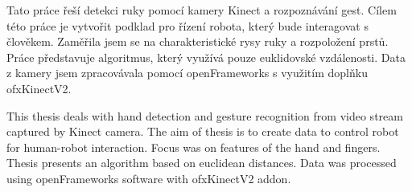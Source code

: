 \startAbstractCz



Tato práce řeší detekci ruky pomocí kamery Kinect a rozpoznávání gest. Cílem této práce je vytvořit podklad pro řízení robota, který bude interagovat s člověkem. Zaměřila jsem se na charakteristické rysy ruky a rozpoložení prstů.
Práce představuje algoritmus, který využívá pouze euklidovské vzdálenosti. Data z kamery jsem zpracovávala pomocí openFrameworks s využitím doplňku ofxKinectV2.



\stopAbstractCz

\startAbstractEn
This thesis deals with hand detection and gesture recognition from video stream captured by Kinect camera. The aim of thesis is to create data to control robot for human-robot interaction. Focus was on features of the hand and fingers. Thesis presents an algorithm based on euclidean distances. Data was processed using openFrameworks software with ofxKinectV2 addon.
\stopAbstractEn

\endinput
